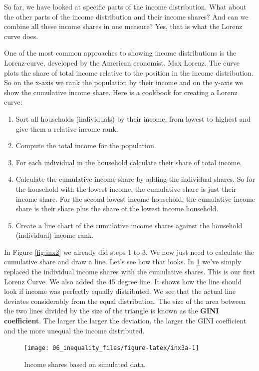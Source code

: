 \documentclass[
]{book}
\providecommand{\tightlist}{%
  \setlength{\itemsep}{0pt}\setlength{\parskip}{0pt}}
\begin{document}
So far, we have looked at specific parts of the income distribution. What about the other parts of the income distribution and their income shares? And can we combine all these income shares in one measure? Yes, that is what the Lorenz curve does.

One of the most common approaches to showing income distributions is the Lorenz-curve, developed by the American economist, Max Lorenz. The curve plots the share of total income relative to the position in the income distribution. So on the x-axis we rank the population by their income and on the y-axis we show the cumulative income share. Here is a cookbook for creating a Lorenz curve:

\begin{enumerate}
\def\labelenumi{\arabic{enumi}.}
\tightlist
\item
  Sort all households (individuals) by their income, from lowest to highest and give them a relative income rank.
\item
  Compute the total income for the population.
\item
  For each individual in the household calculate their share of total income.
\item
  Calculate the cumulative income share by adding the individual shares. So for the household with the lowest income, the cumulative share is just their income share. For the second lowest income household, the cumulative income share is their share plus the share of the lowest income household.
\item
  Create a line chart of the cumulative income shares against the household (individual) income rank.
\end{enumerate}

In Figure \ref{fig:inx2} we already did steps 1 to 3. We now just need to calculate the cumulative share and draw a line. Let's see how that looks. In \ref{fig:inx3a} we've simply replaced the individual income shares with the cumulative shares. This is our first Lorenz Curve. We also added the 45 degree line. It shows how the line should look if income was perfectly equally distributed. We see that the actual line deviates considerably from the equal distribution. The size of the area between the two lines divided by the size of the triangle is known as the \textbf{GINI coefficient}. The larger the larger the deviation, the larger the GINI coefficient and the more unequal the income distributed.

\begin{figure}

{\centering \texttt{[image: 06\_inequality\_files/figure-latex/inx3a-1]} 

}

\caption{\label{fig:figx} Income shares based on simulated data.}\label{fig:inx3a}
\end{figure}
\end{document}
